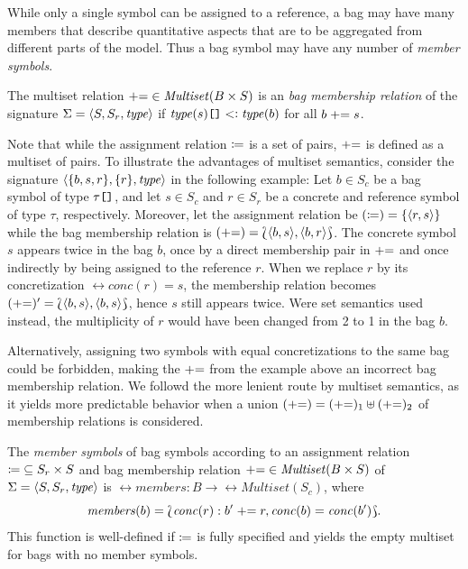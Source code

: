 While only a single symbol can be assigned to a reference, a bag may have many members that describe quantitative aspects that are to be aggregated from different parts of the model. Thus a bag symbol may have any number of \emph{member symbols}.
\begin{dfn}
  The multiset relation \({\mathrel{{+}{=}}} \in \textrm{\itshape Multiset\/}(B \times S)\) is an \emph{ bag membership relation} of the signature \(\Sigma = \langle S, S_r, \textrm{\itshape type\/} \rangle\) if \(\textrm{\itshape type\/}(s)\mathclose{\texttt{[]}} \mathrel{<\vcentcolon} \textrm{\itshape type\/}(b)\) for all \(b \mathrel{{+}{=}} s\).
\end{dfn}

Note that while the assignment relation \(\coloneq\) is a set of pairs, \(\mathrel{{+}{=}}\) is defined as a multiset of pairs. To illustrate the advantages of multiset semantics, consider the signature \(\langle \{b, s, r\}, \{r\}, \textrm{\itshape type\/} \rangle\) in the following example: Let \(b \in S_c\) be a bag symbol of type \(\tau\mathclose{\texttt{[]}}\), and let \(s \in S_c\) and \(r \in S_r\) be a concrete and reference symbol of type $\tau$, respectively. Moreover, let the assignment relation be \((\coloneq) = \{\langle r, s\rangle\}\) while the bag membership relation is \((\mathrel{{+}{=}}) = \Lbag \langle b, s\rangle, \langle b, r\rangle\Rbag\). The concrete symbol \(s\) appears twice in the bag \(b\), once by a direct membership pair in \(\mathrel{{+}{=}}\) and once indirectly by being assigned to the reference \(r\). When we replace \(r\) by its concretization \(\rel{conc}(r) = s\), the membership relation becomes \((\mathrel{{+}{=}})' = \Lbag \langle b, s\rangle, \langle b, s\rangle\Rbag\), hence \(s\) still appears twice. Were set semantics used instead, the multiplicity of \(r\) would have been changed from 2 to 1 in the bag \(b\).

Alternatively, assigning two symbols with equal concretizations to the same bag could be forbidden, making the \(\mathrel{{+}{=}}\) from the example above an incorrect bag membership relation. We followd the more lenient route by multiset semantics, as it yields more predictable behavior when a union \((\mathrel{{+}{=}}) = (\mathrel{{+}{=}})_1 \uplus (\mathrel{{+}{=}})_2\) of membership relations is considered.

\begin{dfn}
  The \emph{member symbols} of bag symbols according to an  assignment relation \({\coloneq} \subseteq S_r \times S\) and bag membership relation \({\mathrel{{+}{=}}} \in \textrm{\itshape Multiset\/}(B \times S)\) of \(\Sigma = \langle S, S_r, \textrm{\itshape type\/} \rangle\) is \(\rel{members}\colon B \to \rel{Multiset}(S_c)\), where
  \begin{equation}
    \label{eq:rgspn:member-symbols}
    \rel{members}(b) = \Lbag \rel{conc}(r) : b' \member r, \rel{conc}(b) = \rel{conc}(b')\Rbag \text.
  \end{equation}
  This function is well-defined if \(\coloneq\) is fully specified and yields the empty multiset for bags with no member symbols.
\end{dfn}

